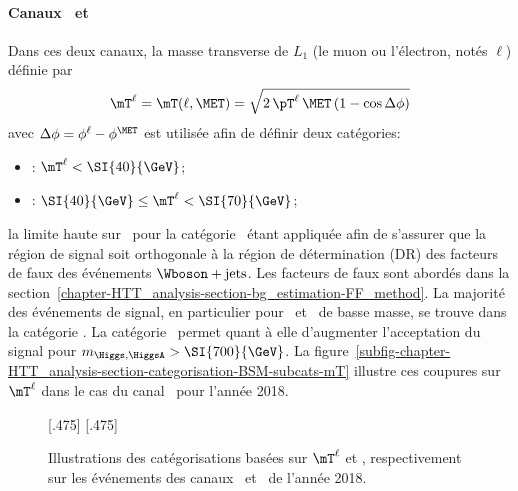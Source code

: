 \paragraph{Canaux \mu\tauh\ et \ele\tauh}
Dans ces deux canaux, la masse transverse de $L_1$ (le muon ou l'électron, notés $\ell$) définie par
\begin{equation}
\mT^{\ell} = \mT(\ell, \MET) = \sqrt{2 \, \pT^{\ell} \, \MET \, (1-\cos\Delta\phi)} \label{eq-mT_def-ell}
\end{equation}
avec $\Delta\phi = \phi^{\ell} - \phi^{\MET}$
est utilisée afin de définir deux catégories:
\begin{itemize}
\item \CATtightmt: $\mT^{\ell} < \SI{40}{\GeV}$;
\item \CATloosemt: $\SI{40}{\GeV} \leq \mT^{\ell} < \SI{70}{\GeV}$;
\end{itemize}
la limite haute sur \mT\ pour la catégorie \CATloosemt\ étant appliquée afin de s'assurer que la région de signal soit orthogonale à la région de détermination (DR) des facteurs de faux des événements $\Wboson+\text{jets}$.
Les facteurs de faux sont abordés dans la section~\ref{chapter-HTT_analysis-section-bg_estimation-FF_method}.
La majorité des événements de signal, en particulier pour \Higgs\ et \HiggsA\ de basse masse, se trouve dans la catégorie \CATtightmt.
La catégorie \CATloosemt\ permet quant à elle d'augmenter l'acceptation du signal pour $m_{\Higgs,\HiggsA} > \SI{700}{\GeV}$.
La figure~\ref{subfig-chapter-HTT_analysis-section-categorisation-BSM-subcats-mT} illustre ces coupures sur $\mT^{\ell}$ dans le cas du canal \ele\tauh\ pour l'année 2018.
\begin{figure}[h]
\centering

[.475\textwidth]
{}
\hfill
{}[.475\textwidth]
{}

\caption[Illustrations des catégorisations basées sur $\mT^{\ell}$ et \Dzeta]{Illustrations des catégorisations basées sur $\mT^{\ell}$ et \Dzeta, respectivement sur les événements des canaux \ele\tauh\ et \ele\mu\ de l'année 2018.}
\label{fig-chapter-HTT_analysis-section-categorisation-BSM-subcats}
\end{figure}
